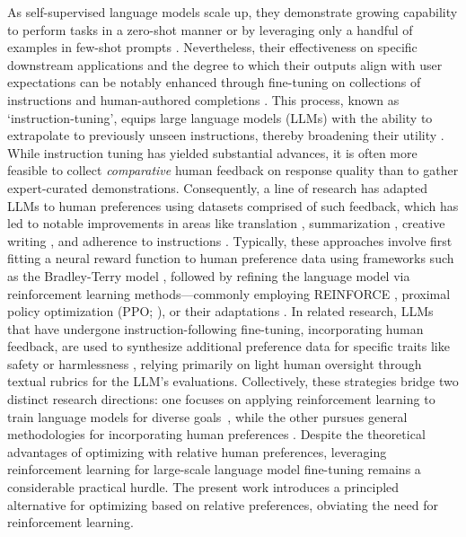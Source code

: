 As self-supervised language models scale up, they demonstrate growing capability to perform tasks in a zero-shot manner \citep{radford2019language} or by leveraging only a handful of examples in few-shot prompts \citep{gpt3,megatron,chowdhery2022palm}. Nevertheless, their effectiveness on specific downstream applications and the degree to which their outputs align with user expectations can be notably enhanced through fine-tuning on collections of instructions and human-authored completions \citep{mishra-etal-2022-cross,sanh2022multitask,chung2022scaling,thoppilan2022lamda}. This process, known as `instruction-tuning', equips large language models (LLMs) with the ability to extrapolate to previously unseen instructions, thereby broadening their utility \citep{chung2022scaling}. While instruction tuning has yielded substantial advances, it is often more feasible to collect \textit{comparative} human feedback on response quality than to gather expert-curated demonstrations. Consequently, a line of research has adapted LLMs to human preferences using datasets comprised of such feedback, which has led to notable improvements in areas like translation \citep{kreutzer-etal-2018-reliability}, summarization \citep{stiennon2022learning,ziegler2020finetuning}, creative writing \citep{ziegler2020finetuning}, and adherence to instructions \citep{ouyang2022training,ramamurthy2023is}. Typically, these approaches involve first fitting a neural reward function to human preference data using frameworks such as the Bradley-Terry model \citep{bradley1952rankanalysis}, followed by refining the language model via reinforcement learning methods—commonly employing REINFORCE \citep{williams1992reinforce}, proximal policy optimization (PPO; \cite{schulman2017proximal}), or their adaptations \citep{ramamurthy2023is}. In related research, LLMs that have undergone instruction-following fine-tuning, incorporating human feedback, are used to synthesize additional preference data for specific traits like safety or harmlessness \citep{bai2022constitutional}, relying primarily on light human oversight through textual rubrics for the LLM’s evaluations. Collectively, these strategies bridge two distinct research directions: one focuses on applying reinforcement learning to train language models for diverse goals~\citep{Ranzato2015SequenceLT,paulus2018a,wu2018learning}, while the other pursues general methodologies for incorporating human preferences \citep{christiano2017deep,kupcsik2018learning}. Despite the theoretical advantages of optimizing with relative human preferences, leveraging reinforcement learning for large-scale language model fine-tuning remains a considerable practical hurdle. The present work introduces a principled alternative for optimizing based on relative preferences, obviating the need for reinforcement learning.

